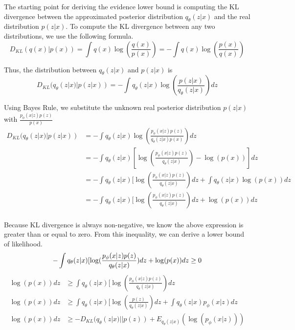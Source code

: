 \documentclass[./dissertation.tex]{subfiles}
\begin{document}
    The starting point for deriving the evidence lower bound is computing the KL divergence between the approximated posterior distribution $q_{\theta}(z|x)$ and the real distribution $p(z|x)$. To compute the KL divergence between any two distributions, we use the following formula. 
    \begin{equation*}
        D_{KL}(q(x)|p(x)) = \int q(x)\log(\frac{q(x)}{p(x)}) = - \int q(x)\log(\frac{p(x)}{q(x)})
    \end{equation*}
    
    Thus, the distribution between $q_{\theta}(z|x)$ and $p(z|x)$ is
    \begin{equation*}
        D_{KL}(q_{\theta}(z|x)|p(z|x)) = - \int q_{\theta}(z|x)\log(\frac{p(z|x)}{q_{\theta}(z|x)})dz
    \end{equation*}
    
    Using Bayes Rule, we substitute the unknown real posterior distribution $p(z|x)$ with $\frac{p_{\phi}(x|z)p(z)}{p(x)}$
    \begin{equation*}
    \begin{aligned}
        D_{KL}(q_{\theta}(z|x)|p(z|x)) &= - \int q_{\theta}(z|x)\log(\frac{p_{\phi}(x|z)p(z)}{q_{\theta}(z|x)p(x)})dz \\
        &= - \int q_{\theta}(z|x)[\log(\frac{p_{\phi}(x|z)p(z)}{q_{\theta}(z|x)}) - \log(p(x))]dz \\
        &= - \int q_{\theta}(z|x)[\log(\frac{p_{\phi}(x|z)p(z)}{q_{\theta}(z|x)})dz + \int q_{\theta}(z|x)\log(p(x))dz \\
        &= - \int q_{\theta}(z|x)[\log(\frac{p_{\phi}(x|z)p(z)}{q_{\theta}(z|x)})dz + \log(p(x))dz \\
    \end{aligned}
    \end{equation*}
    
    Because KL divergence is always non-negative, we know the above expression is greater than or equal to zero. From this inequality, we can derive a lower bound of likelihood.
    \begin{equation*}
    - \int q_{\theta}(z|x)[\log(\frac{p_{\phi}(x|z)p(z)}{q_{\theta}(z|x)})dz + \log(p(x))dz \geq 0 \\
    \end{equation*}
    \begin{equation*}
    \begin{aligned}
    \log(p(x))dz &\geq \int q_{\theta}(z|x)[\log(\frac{p_{\phi}(x|z)p(z)}{q_{\theta}(z|x)})dz \\
    \log(p(x))dz &\geq \int q_{\theta}(z|x)[\log(\frac{p(z)}{q_{\theta}(z|x)})dz + \int q_{\theta}(z|x)p_{\phi}(x|z)dz \\
    \log(p(x))dz &\geq -D_{KL}(q_{\theta}(z|x)||p(z)) + E_{q_{\theta}(z|x)}(\log(p_{\phi}(x|z)))
    \end{aligned}
    \end{equation*}
    
\end{document}
